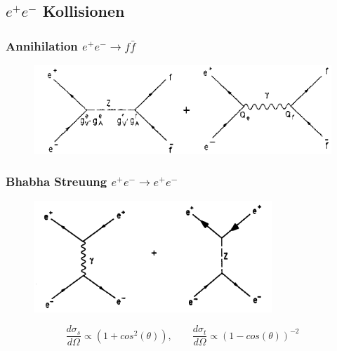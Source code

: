 \subsection{$e^+e^-$ Kollisionen}
\begin{frame}
	\frametitle{Annihilation $e^+e^- \rightarrow f\bar{f}$ }
	\begin{center}
		\begin{figure}
			\includegraphics[width=1.0\textwidth]{graphics/annihilation.png}
		\end{figure}
	\end{center}
\end{frame}
\begin{frame}
	\frametitle{Bhabha Streuung $e^+e^- \rightarrow e^+e^-$ }
	\begin{center}
		\begin{figure}
			\includegraphics[width=0.8\textwidth]{graphics/Bhabbastreuung.png}
		\end{figure}
	\end{center}
	\begin{equation*}
	\frac{d\sigma_s}{d\Omega} \propto (1+cos^2(\theta)),\qquad\frac{d\sigma_t}{d\Omega} \propto (1-cos(\theta))^{-2}
	\end{equation*}
\end{frame}
